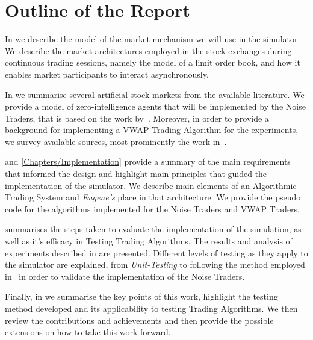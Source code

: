 \section{Outline of the Report \label{Chapters/Introduction/Outline}}

In  we describe the model of the market mechanism we will use in the simulator. We describe the market architectures employed in the stock exchanges during continuous trading sessions, namely the model of a limit order book, and how it enables market participants to interact asynchronously.

In  we summarise several artificial stock markets from the available literature. We provide a model of zero-intelligence agents that will be implemented by the Noise Traders, that is based on the work by~\citet[chap.~4]{Gilles2006}. Moreover, in order to provide a background for implementing a VWAP Trading Algorithm for the experiments, we survey available sources, most prominently the work in~\cite{Coggins2006, Kakade2004}. 

 and \ref{Chapters/Implementation} provide a summary of the main requirements that informed the design and highlight main principles that guided the implementation of the simulator. We describe main elements of an Algorithmic Trading System and \textit{Eugene's} place in that architecture. We provide the pseudo code for the algorithms implemented for the Noise Traders and VWAP Traders.

 summarises the steps taken to evaluate the implementation of the simulation, as well as it's efficacy in Testing Trading Algorithms. The results and analysis of experiments described in  are presented. Different levels of testing as they apply to the simulator are explained, from \textit{Unit-Testing} to following the method employed in~\cite[chap.~4]{Gilles2006} in order to validate the implementation of the Noise Traders.

Finally, in  we summarise the key points of this work, highlight the testing method developed and its applicability to testing Trading Algorithms. We then review the contributions and achievements and then provide the possible extensions on how to take this work forward.



